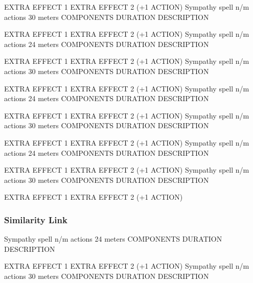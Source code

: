         EXTRA EFFECT 1
        EXTRA EFFECT 2 (+1 ACTION)
        {Sympathy spell}
        {n/m actions}
        {30 meters}
        {COMPONENTS}
        {DURATION}
        DESCRIPTION

        EXTRA EFFECT 1
        EXTRA EFFECT 2 (+1 ACTION)
        {Sympathy spell}
        {n/m actions}
        {24 meters}
        {COMPONENTS}
        {DURATION}
        DESCRIPTION

        EXTRA EFFECT 1
        EXTRA EFFECT 2 (+1 ACTION)
        {Sympathy spell}
        {n/m actions}
        {30 meters}
        {COMPONENTS}
        {DURATION}
        DESCRIPTION

        EXTRA EFFECT 1
        EXTRA EFFECT 2 (+1 ACTION)
        {Sympathy spell}
        {n/m actions}
        {24 meters}
        {COMPONENTS}
        {DURATION}
        DESCRIPTION

        EXTRA EFFECT 1
        EXTRA EFFECT 2 (+1 ACTION)
        {Sympathy spell}
        {n/m actions}
        {30 meters}
        {COMPONENTS}
        {DURATION}
        DESCRIPTION

        EXTRA EFFECT 1
        EXTRA EFFECT 2 (+1 ACTION)
        {Sympathy spell}
        {n/m actions}
        {24 meters}
        {COMPONENTS}
        {DURATION}
        DESCRIPTION

        EXTRA EFFECT 1
        EXTRA EFFECT 2 (+1 ACTION)
        {Sympathy spell}
        {n/m actions}
        {30 meters}
        {COMPONENTS}
        {DURATION}
        DESCRIPTION

        EXTRA EFFECT 1
        EXTRA EFFECT 2 (+1 ACTION)
\subsubsection{Similarity Link}
        {Sympathy spell}
        {n/m actions}
        {24 meters}
        {COMPONENTS}
        {DURATION}
        DESCRIPTION

        EXTRA EFFECT 1
        EXTRA EFFECT 2 (+1 ACTION)
        {Sympathy spell}
        {n/m actions}
        {30 meters}
        {COMPONENTS}
        {DURATION}
        DESCRIPTION

